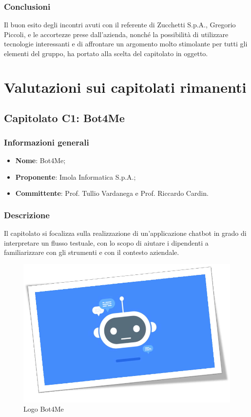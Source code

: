 \documentclass[11pt]{article}
\begin{document}
    \subsubsection{Conclusioni}
    Il buon esito degli incontri avuti con il referente di Zucchetti S.p.A., Gregorio Piccoli, e le accortezze prese dall'azienda,
    nonché la possibilità di utilizzare tecnologie interessanti e di affrontare un argomento molto stimolante per tutti gli elementi del
    gruppo, ha portato alla scelta del capitolato in oggetto.

\newpage


\section{Valutazioni sui capitolati rimanenti}

\subsection{Capitolato C1: Bot4Me}

    \subsubsection{Informazioni generali}
    \begin{itemize}
        \item \textbf{Nome}: Bot4Me;
        \item \textbf{Proponente}: Imola Informatica S.p.A.;
        \item \textbf{Committente}: Prof. Tullio Vardanega e Prof. Riccardo Cardin.
    \end{itemize}
    
    \subsubsection{Descrizione}
    Il capitolato si focalizza sulla realizzazione di un'applicazione chatbot in grado di interpretare un flusso testuale,
    con lo scopo di aiutare i dipendenti a familiarizzare con gli strumenti e con il contesto aziendale.
    
    \begin{figure}[h!]
        \centering
        \includegraphics[scale=0.3]{Res/BotMe.png}
        \caption{Logo Bot4Me}
        \label{Bot4Me}
    \end{figure} 
    
\end{document}
